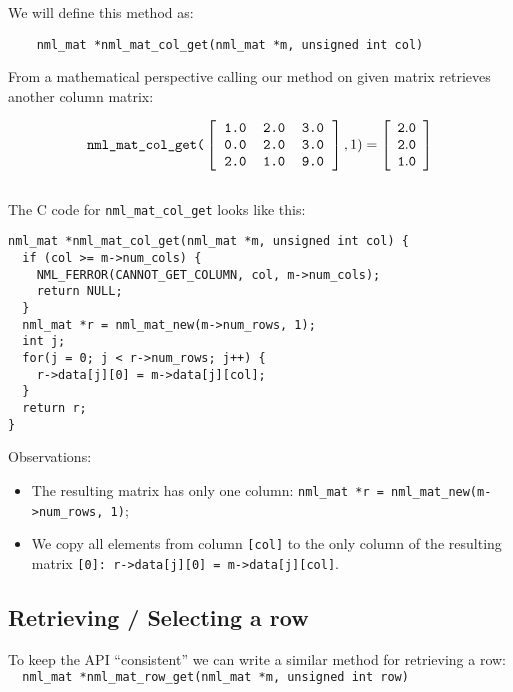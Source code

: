 We will define this method as:

\begin{verbatim}
    nml_mat *nml_mat_col_get(nml_mat *m, unsigned int col)
\end{verbatim}

From a mathematical perspective calling our method on given matrix retrieves another column matrix:

$$
\texttt{nml\_mat\_col\_get(}
\left[ \begin{tabular}{rrr}
\tt 1.0 & \tt 2.0 & \tt 3.0 \\
\tt 0.0 & \tt 2.0 & \tt 3.0 \\
\tt 2.0 & \tt 1.0 & \tt 9.0
\end{tabular} \right]
,1) =
\left[ \begin{array}{rrr}
\tt 2.0 \\
\tt 2.0 \\
\tt 1.0
\end{array} \right]
$$
\\
The C code for {\tt nml\_mat\_col\_get} looks like this:

\begin{verbatim}
nml_mat *nml_mat_col_get(nml_mat *m, unsigned int col) {
  if (col >= m->num_cols) {
    NML_FERROR(CANNOT_GET_COLUMN, col, m->num_cols);
    return NULL;
  }
  nml_mat *r = nml_mat_new(m->num_rows, 1);
  int j;
  for(j = 0; j < r->num_rows; j++) {
    r->data[j][0] = m->data[j][col];
  }
  return r;
} 
\end{verbatim}

Observations:
\\

\begin{itemize}
\item The resulting matrix has only one column: {\tt nml\_mat *r = nml\_mat\_new(m->num\_rows, 1)};
\item We copy all elements from column {\tt [col]} to the only column of the resulting matrix {\tt [0]: r->data[j][0] = m->data[j][col]}.
\end{itemize}

\subsection{Retrieving / Selecting a row}

To keep the API “consistent” we can write a similar method for retrieving a row:
\\

\texttt{ \ nml\_mat *nml\_mat\_row\_get(nml\_mat *m, unsigned int row)}
\\

